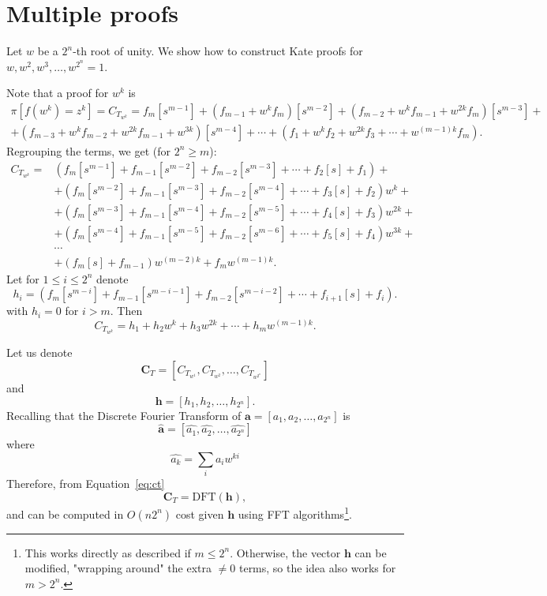 \documentclass[a4paper]{article}
\begin{document}
\section{Multiple proofs}\label{sec:multiproof}

Let $w$ be a $2^n$-th root of unity. We show how to construct Kate proofs for  $w,w^2,w^3,\ldots, w^{2^n}=1$. 

Note that a proof for $w^k$ is
\begin{multline}
\pi[f(w^k)=z^k] = C_{T_{w^k}}  =f_m[s^{m-1}] + (f_{m-1}+w^kf_{m})[s^{m-2}] + (f_{m-2}+w^kf_{m-1}+w^{2k}f_m)[s^{m-3}] +\\+
(f_{m-3}+w^kf_{m-2}+w^{2k}f_{m-1}+w^{3k})[s^{m-4}]+\cdots +  (f_{1}+w^kf_{2}+w^{2k}f_3+\cdots+w^{(m-1)k}f_m).
\end{multline}
Regrouping the terms, we get (for $2^n\geq m$):
\begin{align}
     C_{T_{w^k}} 
     =&\left(f_m[s^{m-1}]+f_{m-1}[s^{m-2}]+f_{m-2}[s^{m-3}]+\cdots + f_2[s]+f_1\right)+\\
     &+\left(f_m[s^{m-2}]+f_{m-1}[s^{m-3}]+f_{m-2}[s^{m-4}]+\cdots + f_3[s]+f_2\right)w^k+\\
     &+\left(f_m[s^{m-3}]+f_{m-1}[s^{m-4}]+f_{m-2}[s^{m-5}]+\cdots + f_4[s]+f_3\right)w^{2k}+\\
     &+\left(f_m[s^{m-4}]+f_{m-1}[s^{m-5}]+f_{m-2}[s^{m-6}]+\cdots + f_5[s]+f_4\right)w^{3k}+\\
     &\cdots\\
     &+(f_m[s]+f_{m-1})w^{(m-2)k}+f_mw^{(m-1)k}.
\end{align}
Let for $1
\leq i \leq 2^n$ denote $$
h_i = \left(f_m[s^{m-i}]+f_{m-1}[s^{m-i-1}]+f_{m-2}[s^{m-i-2}]+\cdots + f_{i+1}[s]+f_i\right).
$$
with $h_i=0$ for $i>m$. Then
\begin{equation}\label{eq:ct}
     C_{T_{w^k}} = h_1 + h_2w^k + h_3w^{2k}+\cdots + h_mw^{(m-1)k}.
\end{equation}

Let us denote
$$
\mathbf{C}_T = [C_{T_{w^1}},C_{T_{w^2}},\ldots,C_{T_{w^{2^n}}}]
$$
and
\begin{equation}\label{eq:h}
\mathbf{h} = [h_1,h_2,\ldots,h_{2^n}].
\end{equation}
Recalling that the Discrete Fourier Transform of $\mathbf{a}=[a_1,a_2,\ldots,a_{2^n}]$ is
$$
\widehat{\mathbf{a}}= [\widehat{a_1},\widehat{a_2},\ldots,\widehat{a_{2^n}}]
$$
where 
$$
\widehat{a_k} = \sum_{i}a_iw^{ki}
$$
Therefore, from Equation~\eqref{eq:ct}
\begin{equation}
 \mathbf{C}_T = \mathrm{DFT}(\mathbf{h}), 
\end{equation}
and can be computed in $O(n2^n)$ cost given $\mathbf{h}$ using FFT algorithms\footnote{This works directly as described if $m\leq2^n$. Otherwise, the vector $\mathbf{h}$ can be modified, "wrapping around" the extra $\neq 0$ terms, so the idea also works for $m>2^n$.}.
\end{document}
